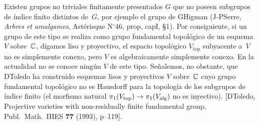 {}
{\begin{remarqueMR}
\label{XII.5.6}
Existen grupos no triviales finitamente presentados $G$ que no poseen
subgrupos de índice finito distintos de~$G$, por ejemplo el grupo de
G\ptbl Higman (\cf J-P\ptbl Serre, \emph{Arbres et amalgames}, Astérisque
N$^\circ$46, prop, cap\ptbl I, \S 1). Por consiguiente, si un grupo
de este tipo se realiza como grupo fundamental topológico de un esquema
$V$ sobre~$\mathbb C$, digamos liso y proyectivo, el espacio topológico
$V_{\mathrm{top}}$ subyacente a~$V$ no es simplemente conexo, pero $V$
es algebraicamente simplemente conexo. En la actualidad no se conoce
ningún $V$ de este tipo. Señalemos, no obstante, que D\ptbl Toledo ha
construido esquemas lisos y proyectivos $V$ sobre~$\mathbb C$ cuyo grupo
fundamental topológico no es Hausdorff para la topología de los
subgrupos de índice finito (el morfismo natural
$\pi_1(V_{\mathrm{top}})\to\pi_1(V_{\mathrm{alg}})$ no es inyectivo).
[D\ptbl Toledo, Projective varieties with non-residually finite
fundamental group, Publ.\ Math.\ IHES \textbf{77} (1993),
p--119].
\end{remarqueMR}}
